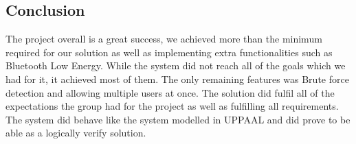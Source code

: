 \subsection{Conclusion}
The project overall is a great success, we achieved more than the minimum required for our solution as well as implementing extra functionalities such as Bluetooth Low Energy. While the system did not reach all of the goals which we had for it, it achieved most of them. The only remaining features was Brute force detection and allowing multiple users at once. The solution did fulfil all of the expectations the group had for the project as well as fulfilling all requirements. The system did behave like the system modelled in UPPAAL and did prove to be able as a logically verify solution.